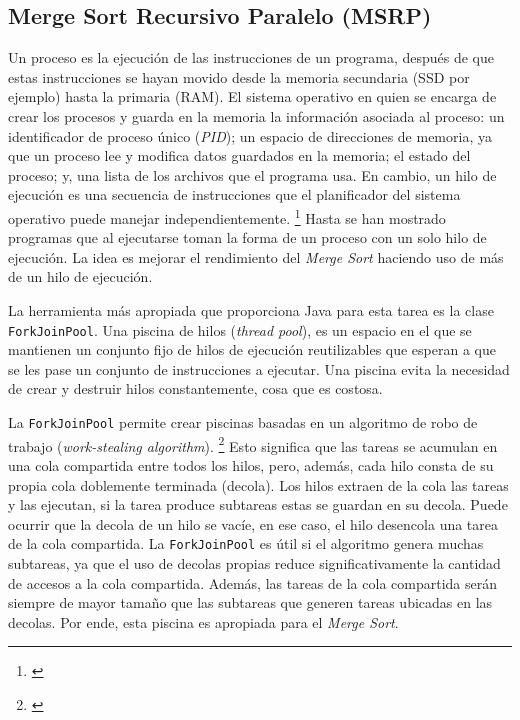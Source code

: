\documentclass[titlepage]{article}
\begin{document}
\subsection{Merge Sort Recursivo Paralelo (MSRP)}
Un proceso es la ejecución de las instrucciones de un programa, después de que estas instrucciones se hayan movido desde la memoria secundaria (SSD por ejemplo) hasta la primaria (RAM). El sistema operativo en quien se encarga de crear los procesos y guarda en la memoria la información asociada al proceso: un identificador de proceso único (\textit{PID}); un espacio de direcciones de memoria, ya que un proceso lee y modifica datos guardados en la memoria; el estado del proceso; y, una lista de los archivos que el programa usa. En cambio, un hilo de ejecución es una secuencia de instrucciones que el planificador del sistema operativo puede manejar independientemente. \footnote{\cite{bobrov-2023}} Hasta se han mostrado programas que al ejecutarse toman la forma de un proceso con un solo hilo de ejecución. La idea es mejorar el rendimiento del \textit{Merge Sort} haciendo uso de más de un hilo de ejecución. 

La herramienta más apropiada que proporciona Java para esta tarea es la clase \lstinline{ForkJoinPool}. Una piscina de hilos (\textit{thread pool}), es un espacio en el que se mantienen un conjunto fijo de hilos de ejecución reutilizables que esperan a que se les pase un conjunto de instrucciones a ejecutar. Una piscina evita la necesidad de crear y destruir hilos constantemente, cosa que es costosa. 

La \lstinline{ForkJoinPool} permite crear piscinas basadas en un algoritmo de robo de trabajo (\textit{work-stealing algorithm}). \footnote{\cite{Ramgir2017-mv}} Esto significa que las tareas se acumulan en una cola compartida entre todos los hilos, pero, además, cada hilo consta de su propia cola doblemente terminada (decola). Los hilos extraen de la cola las tareas y las ejecutan, si la tarea produce subtareas estas se guardan en su decola. Puede ocurrir que la decola de un hilo se vacíe, en ese caso, el hilo desencola una tarea de la cola compartida. La \lstinline{ForkJoinPool} es útil si el algoritmo genera muchas subtareas, ya que el uso de decolas propias reduce significativamente la cantidad de accesos a la cola compartida. Además, las tareas de la cola compartida serán siempre de mayor tamaño que las subtareas que generen tareas ubicadas en las decolas. Por ende, esta piscina es apropiada para el \textit{Merge Sort}.
\end{document}
